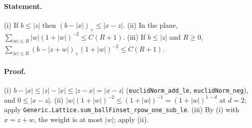 \paragraph{Statement.} (i) If $b\le|z|$ then $(b-|x|)_+\le|x-z|$. (ii) In the plane,
$\sum_{|w|\le R}|w|(1+|w|)^{-2}\le C(R+1)$. (iii) If $b\le|z|$ and $R\ge0$,
$\sum_{|w|\le R}(b-|z+w|)_+(1+|w|)^{-2}\le C(R+1)$.
\paragraph{Proof.} (i) $b-|x|\le|z|-|x|\le|z-x|=|x-z|$ (\texttt{euclidNorm\_add\_le},
\texttt{euclidNorm\_neg}), and $0\le|x-z|$. (ii) $|w|(1+|w|)^{-2}\le(1+|w|)^{-1}=(1+|w|)^{1-d}$ at
$d=2$; apply \texttt{Generic.Lattice.sum\_ballFinset\_rpow\_one\_sub\_le}. (iii) By (i) with
$x=z+w$, the weight is at most $|w|$; apply (ii).
